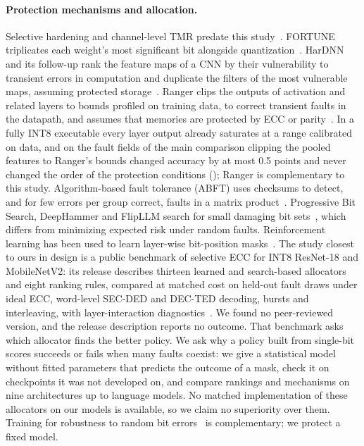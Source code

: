 \paragraph{Protection mechanisms and allocation.} Selective hardening and channel-level TMR predate this study~\cite{libano2019selective,garciabertoa2023selective}. FORTUNE triplicates each weight's most significant bit alongside quantization~\cite{nazari2024fortune}. HarDNN and its follow-up rank the feature maps of a CNN by their vulnerability to transient errors in computation and duplicate the filters of the most vulnerable maps, assuming protected storage~\cite{mahmoud2020hardnn,mahmoud2021optimizing}. Ranger clips the outputs of activation and related layers to bounds profiled on training data, to correct transient faults in the datapath, and assumes that memories are protected by ECC or parity~\cite{chen2021ranger}. In a fully INT8 executable every layer output already saturates at a range calibrated on data, and on the fault fields of the main comparison clipping the pooled features to Ranger's bounds changed accuracy by at most 0.5 points and never changed the order of the protection conditions (); Ranger is complementary to this study. Algorithm-based fault tolerance (ABFT) uses checksums to detect, and for few errors per group correct, faults in a matrix product~\cite{alyamani2001abft,zhao2021ftcnn}. Progressive Bit Search, DeepHammer and FlipLLM search for small damaging bit sets~\cite{rakin2019bitflip,yao2020deephammer,khalil2026flipllm}, which differs from minimizing expected risk under random faults. Reinforcement learning has been used to learn layer-wise bit-position masks~\cite{su2025rl}. The study closest to ours in design is a public benchmark of selective ECC for INT8 ResNet-18 and MobileNetV2: its release describes thirteen learned and search-based allocators and eight ranking rules, compared at matched cost on held-out fault draws under ideal ECC, word-level SEC-DED and DEC-TED decoding, bursts and interleaving, with layer-interaction diagnostics~\cite{alobaidi2026selectiveecc}. We found no peer-reviewed version, and the release description reports no outcome. That benchmark asks which allocator finds the better policy. We ask why a policy built from single-bit scores succeeds or fails when many faults coexist: we give a statistical model without fitted parameters that predicts the outcome of a mask, check it on checkpoints it was not developed on, and compare rankings and mechanisms on nine architectures up to language models. No matched implementation of these allocators on our models is available, so we claim no superiority over them. Training for robustness to random bit errors~\cite{stutz2021biterror} is complementary; we protect a fixed model.

